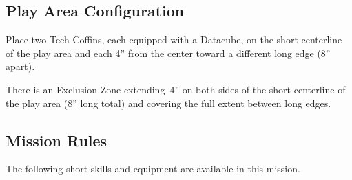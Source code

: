 \label{mission:smashandgrab}

\subsection{Play Area Configuration}

Place two Tech-Coffins, each equipped with a Datacube, on the short
centerline of the play area and each 4'' from the center toward a
different long edge (8'' apart).

  There is an Exclusion Zone
extending~4'' on both sides of the short centerline of the play area
(8'' long total) and covering the full extent between long edges.

\subsection{Mission Rules}

The following short skills and equipment are available in this mission.

